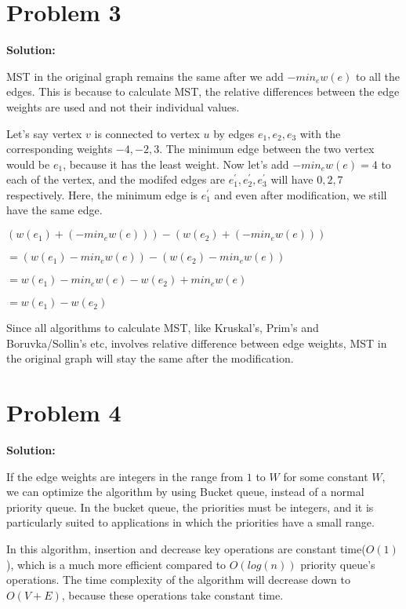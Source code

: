 \documentclass{article}
\begin{document}
\section*{Problem 3}
\textbf{Solution:}


MST in the original graph remains the same after we add $-min_ew(e)$ to all the edges. This is because to calculate MST, the relative differences between the edge weights are used and not their individual values.

Let's say vertex $v$ is connected to vertex $u$ by edges $e_1, e_2, e_3$ with the corresponding weights $-4, -2, 3$. The minimum edge between the two vertex would be $e_1$, because it has the least weight. Now let's add $-min_ew(e)=4$ to each of the vertex, and the modifed edges are $e_1^\prime, e_2^\prime, e_3^\prime$ will have $0, 2, 7$ respectively. Here, the minimum edge is $e_1^\prime$ and even after modification, we still have the same edge.
\vspace{2mm}

$(w(e_1)+(-min_ew(e)))-(w(e_2)+(-min_ew(e)))$

\qquad$= (w(e_1)-min_ew(e))-(w(e_2)-min_ew(e))$

\qquad$= w(e_1)-min_ew(e)-w(e_2)+min_ew(e)$

\qquad$= w(e_1)-w(e_2)$
\vspace{2mm}

Since all algorithms to calculate MST, like Kruskal's, Prim's and Boruvka/Sollin's etc, involves relative difference between edge weights, MST in the original graph will stay the same after the modification.


\section*{Problem 4}
\textbf{Solution:}

If the edge weights are integers in the range from $1$ to $W$ for some constant $W$, we can optimize the algorithm by using Bucket queue\cite{wiki}, instead of a normal priority queue. In the bucket queue, the priorities must be integers, and it is particularly suited to applications in which the priorities have a small range.\cite{algo}

In this algorithm, insertion and decrease key operations are constant time($O(1)$), which is a much more efficient compared to $O(log(n))$ priority queue's operations. The time complexity of the algorithm will decrease down to $O(V+E)$, because these operations take constant time.
\end{document}
